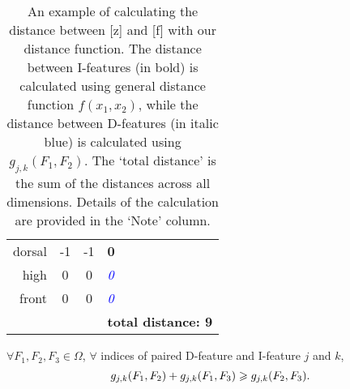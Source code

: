 \begin{table*}[t!]
\begin{tabular}{rccll}
    dorsal & -1    & -1    & \textbf{0} &  \\
    high  & 0     & 0     & \textcolor{blue}{\textit{0}} &  \\
    front & 0     & 0     & \textcolor{blue}{\textit{0}} & \\
    \hline
    & & & \multicolumn{2}{l}{\textbf{total distance: 9}} \\
    \bottomrule
    \end{tabular}%
  \caption{An example of calculating the distance between [z] and [f] with our distance function. The distance between I-features (in bold) is calculated using general distance function $f(x_1, x_2)$, while the distance between D-features (in italic blue) is calculated using $g_{j,k}(F_1, F_2)$. The `total distance' is the sum of the distances across all dimensions. Details of the calculation are provided in the `Note' column.}
  \label{tab:exp-calcuate-dist}%
\end{table*}%

\begin{theorem} \label{proposition}
    $\forall F_1,F_2,F_3\in\Omega$, $\forall$ indices of paired D-feature and I-feature $j$ and $k$,
    \begin{equation}\label{eq:triangle}
    \setlen
        g_{j,k}(F_1,F_2)+g_{j,k}(F_1,F_3)\geqslant g_{j,k}(F_2,F_3).
    \end{equation}
\end{theorem}

